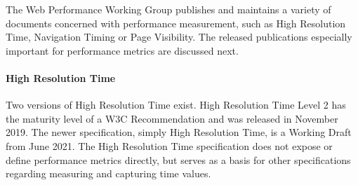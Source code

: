 
The Web Performance Working Group publishes and maintains a variety of documents concerned with performance measurement, such as High Resolution Time, Navigation Timing or Page Visibility. %
The released publications especially important for performance metrics are discussed next.






















\paragraph{High Resolution Time}

Two versions of High Resolution Time exist.
High Resolution Time Level 2 has the maturity level of a W3C Recommendation and was released in November 2019. %
The newer specification, simply High Resolution Time,  is a Working Draft from June 2021.%
The High Resolution Time specification does not expose or define performance metrics directly, but serves as a basis for other specifications regarding measuring and capturing time values.


